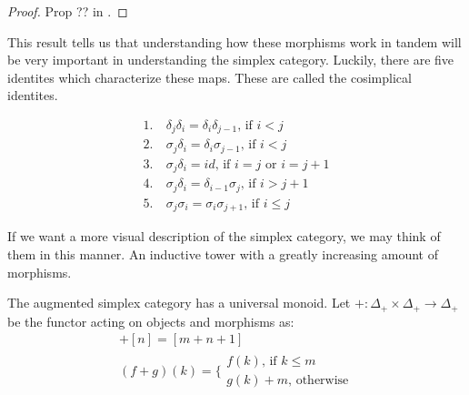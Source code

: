 \documentclass[../thesis.tex]{subfiles}
\begin{document}
        \begin{proof}
            Prop ??  in \cite{MacLane71}.
        \end{proof}

        This result tells us that understanding how these morphisms work in tandem will be very important in understanding the simplex category. Luckily, there are five identites which characterize these maps. These are called the cosimplical identites.

        \begin{align*}
            1.&\ \delta_j\delta_i = \delta_i\delta_{j-1} \text{, if }i<j \\
            2.&\ \sigma_j\delta_i = \delta_i\sigma_{j-1} \text{, if }i<j \\
            3.&\ \sigma_j\delta_i = id \text{, if }i=j\text{ or }i=j+1 \\
            4.&\ \sigma_j\delta_i = \delta_{i-1}\sigma_j \text{, if }i>j+1 \\
            5.&\ \sigma_j\sigma_i = \sigma_i\sigma_{j+1} \text{, if }i\leq j
        \end{align*}
        
        If we want a more visual description of the simplex category, we may think of them in this manner. An inductive tower with a greatly increasing amount of morphisms. 
        \begin{center}

        \end{center}

        The augmented simplex category has a universal monoid. Let $+:\Delta_+ \times \Delta_+ \rightarrow \Delta_+$ be the functor acting on objects and morphisms as:
        \begin{align*}
            [m]+[n] = [m+n+1] \\
            (f+g)(k) = \biggl\{\substack{f(k)\text{, if }k\leq m \\ g(k)+m\text{, otherwise}}
        \end{align*}
\end{document}
